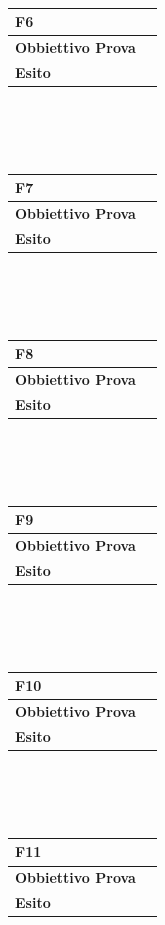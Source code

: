 \documentclass[11pt,titlepage,a4paper]{report}
\begin{document}
\\
\begin{tabular}{||p{4.5cm}||p{7.5cm}||}
\hline
\textbf{\textsf{F6}} \\
\hline
{\textbf {Obbiettivo Prova}}& \\ \hline
{\textbf{Esito}}&  \\ \hline
\end{tabular} \\
\\
\\
\begin{tabular}{||p{4.5cm}||p{7.5cm}||}
\hline
\textbf{\textsf{F7}} \\
\hline
{\textbf {Obbiettivo Prova}}& \\ \hline
{\textbf{Esito}}&  \\ \hline
\end{tabular} \\
\\
\\
\begin{tabular}{||p{4.5cm}||p{7.5cm}||}
\hline
\textbf{\textsf{F8}} \\
\hline
{\textbf {Obbiettivo Prova}}& \\ \hline
{\textbf{Esito}}&  \\ \hline
\end{tabular} \\
\\
\\
\begin{tabular}{||p{4.5cm}||p{7.5cm}||}
\hline
\textbf{\textsf{F9}} \\
\hline
{\textbf {Obbiettivo Prova}}& \\ \hline
{\textbf{Esito}}&  \\ \hline
\end{tabular} \\
\\
\\
\begin{tabular}{||p{4.5cm}||p{7.5cm}||}
\hline
\textbf{\textsf{F10}} \\
\hline
{\textbf {Obbiettivo Prova}}& \\ \hline
{\textbf{Esito}}&  \\ \hline
\end{tabular} \\
\\
\\
\begin{tabular}{||p{4.5cm}||p{7.5cm}||}
\hline
\textbf{\textsf{F11}} \\
\hline
{\textbf {Obbiettivo Prova}}& \\ \hline
{\textbf{Esito}}&  \\ \hline
\end{tabular} \\
\end{document}

